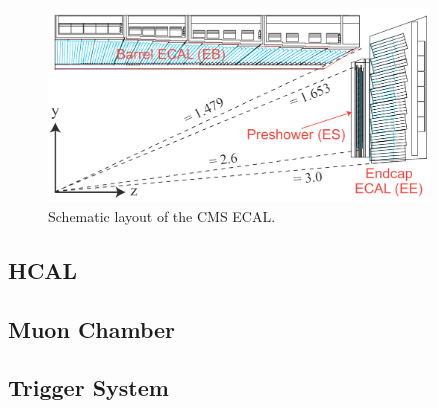 \begin{figure}[hbtp]
  \begin{center}
    \includegraphics[width=0.9\textwidth]{figure/CH2/ECAL.png}
  \end{center}
  \caption{\label{fig:ECAL}Schematic layout of the CMS ECAL.}
\end{figure}










\subsection{HCAL}
\subsection{Muon Chamber}
\subsection{Trigger System}
